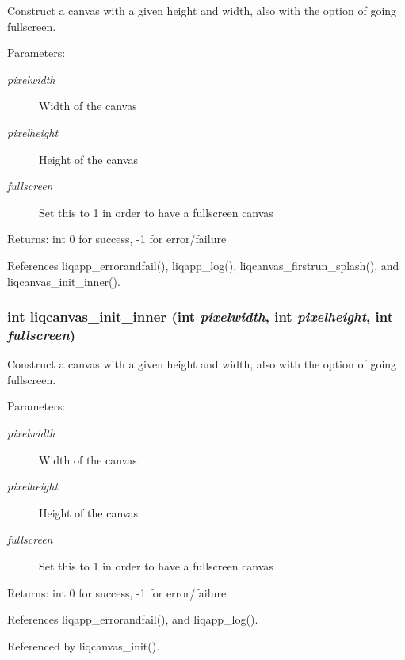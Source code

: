 Construct a canvas with a given height and width, also with the option of going fullscreen. \begin{Desc}
\item[Parameters:]
\begin{description}
\item[{\em pixelwidth}]Width of the canvas \item[{\em pixelheight}]Height of the canvas \item[{\em fullscreen}]Set this to 1 in order to have a fullscreen canvas \end{description}
\end{Desc}
\begin{Desc}
\item[Returns:]int 0 for success, -1 for error/failure \end{Desc}


References liqapp\_\-errorandfail(), liqapp\_\-log(), liqcanvas\_\-firstrun\_\-splash(), and liqcanvas\_\-init\_\-inner().
\subsubsection[{liqcanvas\_\-init\_\-inner}]{\setlength{\rightskip}{0pt plus 5cm}int liqcanvas\_\-init\_\-inner (int {\em pixelwidth}, \/  int {\em pixelheight}, \/  int {\em fullscreen})}\label{d6/df5/liqcanvas_8c_b6dffbe0dd307c339341678ea62c39f2}


Construct a canvas with a given height and width, also with the option of going fullscreen. \begin{Desc}
\item[Parameters:]
\begin{description}
\item[{\em pixelwidth}]Width of the canvas \item[{\em pixelheight}]Height of the canvas \item[{\em fullscreen}]Set this to 1 in order to have a fullscreen canvas \end{description}
\end{Desc}
\begin{Desc}
\item[Returns:]int 0 for success, -1 for error/failure \end{Desc}


References liqapp\_\-errorandfail(), and liqapp\_\-log().

Referenced by liqcanvas\_\-init().